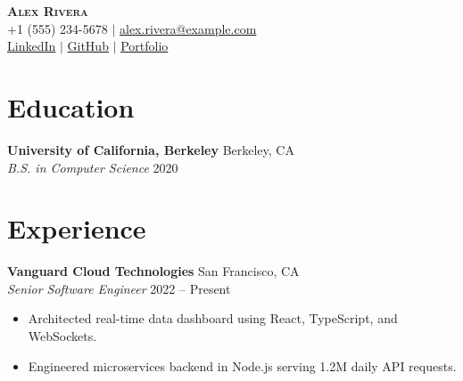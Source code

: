 \documentclass[a4paper,10pt]{article}
\begin{document}
\begin{center}
  \textbf{\Huge \scshape Alex Rivera} \\ \vspace{2pt}
  \small +1 (555) 234-5678 $|$ \href{mailto:alex.rivera@example.com}{alex.rivera@example.com} \\
  \href{https://linkedin.com/in/alex-rivera-dev}{LinkedIn} $|$ 
  \href{https://github.com/alexrivera-code}{GitHub} $|$ 
  \href{https://alexrivera.dev}{Portfolio}
\end{center}

\section{Education}
\textbf{University of California, Berkeley} \hfill Berkeley, CA \\
\textit{B.S. in Computer Science} \hfill 2020

\section{Experience}
\textbf{Vanguard Cloud Technologies} \hfill San Francisco, CA \\
\textit{Senior Software Engineer} \hfill 2022 -- Present
\begin{itemize}[leftmargin=0.15in, itemsep=1pt]
  \item Architected real-time data dashboard using React, TypeScript, and WebSockets.
  \item Engineered microservices backend in Node.js serving 1.2M daily API requests.
\end{itemize}
\end{document}
